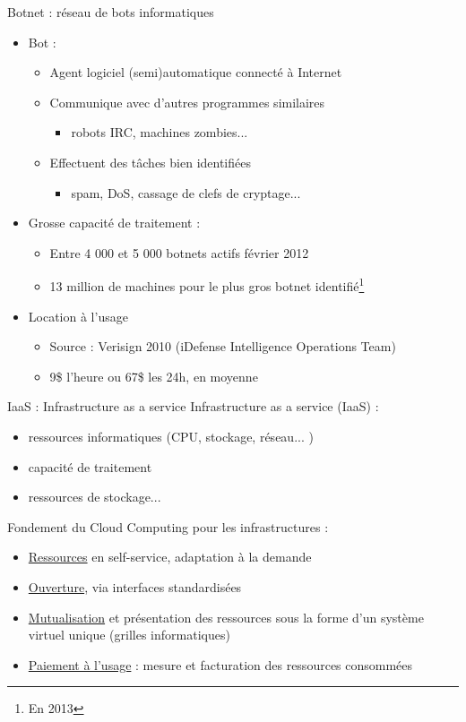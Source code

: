 \begin{frame}{Botnet \cite{wp-botnet} : réseau de bots informatiques}
\begin{itemize}
\item Bot : \begin{itemize}
\item Agent logiciel (semi)automatique connecté à Internet
\item Communique avec d'autres programmes similaires
\begin{itemize}
\item robots IRC, machines zombies...
\end{itemize}
\item Effectuent des tâches bien identifiées
\begin{itemize}
\item spam, DoS, cassage de clefs de cryptage...
\end{itemize}
\end{itemize}

\item Grosse capacité de traitement :
\begin{itemize}
\item Entre 4 000 et 5 000 botnets actifs février 2012
\item 13 million de machines pour le plus gros botnet identifié\footnote{En 2013}
\end{itemize}
\item Location à l'usage
\begin{itemize}
\item Source : Verisign 2010 (iDefense Intelligence Operations Team)
\item 9\$ l'heure ou 67\$ les 24h, en moyenne
\end{itemize}

\end{itemize}
\end{frame}

\begin{frame}{IaaS : Infrastructure as a service \cite{wp-IaaS}}
Infrastructure as a service (IaaS) :
\begin{itemize}
\item ressources informatiques (CPU, stockage, réseau... )
\item capacité de traitement
\item ressources de stockage...
\end{itemize}

Fondement du Cloud Computing\cite{wp-cloud} pour les infrastructures :
\begin{itemize}
\item \underline{Ressources} en self-service, adaptation à la demande
\item \underline{Ouverture}, via interfaces standardisées
\item \underline{Mutualisation} et présentation des ressources sous la forme d'un système virtuel unique (grilles informatiques)
\item \underline{Paiement à l'usage} : mesure et facturation des ressources consommées
\end{itemize}
\end{frame}

